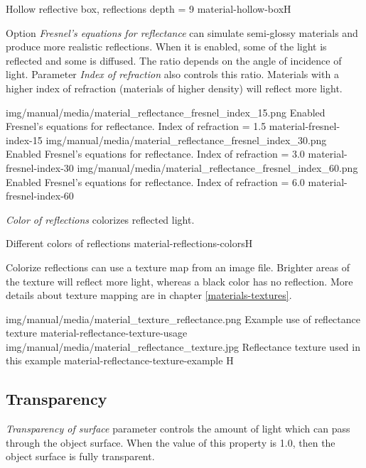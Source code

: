 {Hollow reflective box, reflections depth = 9}
{material-hollow-box}{H}

Option \emph{Fresnel's equations for reflectance} can simulate semi-glossy materials and produce more realistic reflections. When it is enabled, some of the light is reflected and some is diffused. The ratio depends on the angle of incidence of light. Parameter \emph{Index of refraction} also controls this ratio. Materials with a higher index of refraction (materials of higher density) will reflect more light. 

\threeImagesWithTwoCaptionsFullWidth
{img/manual/media/material_reflectance_fresnel_index_15.png}
{Enabled Fresnel's equations for reflectance. Index of refraction = 1.5}
{material-fresnel-index-15}
{img/manual/media/material_reflectance_fresnel_index_30.png}
{Enabled Fresnel's equations for reflectance. Index of refraction = 3.0}
{material-fresnel-index-30}
{img/manual/media/material_reflectance_fresnel_index_60.png}
{Enabled Fresnel's equations for reflectance. Index of refraction = 6.0}
{material-fresnel-index-60}

\emph{Color of reflections} colorizes reflected light.

{Different colors of reflections}
{material-reflections-colors}{H}

Colorize reflections can use a texture map from an image file. Brighter areas of the texture will reflect more light, whereas a black color has no reflection. More details about texture mapping are in chapter \ref{materials-textures}.

\twoImagesWithTwoCaptionsFullWidth
{img/manual/media/material_texture_reflectance.png}
{Example use of reflectance texture}
{material-reflectance-texture-usage}
{img/manual/media/material_reflectance_texture.jpg}
{Reflectance texture used in this example}
{material-reflectance-texture-example}
{H}

\subsection{Transparency}\label{materials-transparency}

\emph{Transparency of surface} parameter controls the amount of light which can pass through the object surface. 
When the value of this property is 1.0, then the object surface is fully transparent. 

